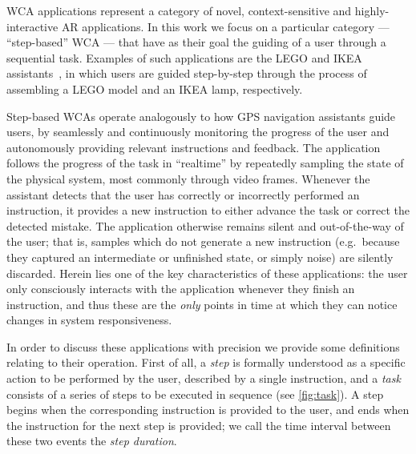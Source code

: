 \acf{WCA} applications represent a category of novel, context-sensitive and highly-interactive \ac{AR} applications.
In this work we focus on a particular category --- ``step-based'' \ac{WCA} --- that have as their goal the guiding of a user through a sequential task.
Examples of such applications are the LEGO and IKEA assistants~\cite{chen2015early,chen2018application}, in which users are guided step-by-step through the process of assembling a LEGO model and an IKEA lamp, respectively.

Step-based \acp{WCA} operate analogously to how \ac{GPS} navigation assistants guide users, by seamlessly and continuously monitoring the progress of the user and autonomously providing relevant instructions and feedback.
The application follows the progress of the task in ``realtime'' by repeatedly sampling the state of the physical system, most commonly through video frames.
Whenever the assistant detects that the user has correctly or incorrectly performed an instruction, it provides a new instruction to either advance the task or correct the detected mistake.
The application otherwise remains silent and out-of-the-way of the user; that is, samples which do not generate a new instruction (e.g.~because they captured an intermediate or unfinished state, or simply noise) are silently discarded.
Herein lies one of the key characteristics of these applications: the user only consciously interacts with the application whenever they finish an instruction, and thus these are the \emph{only} points in time at which they can notice changes in system responsiveness.

In order to discuss these applications with precision we provide some definitions relating to their operation.
First of all, a \emph{step} is formally understood as a specific action to be performed by the user, described by a single instruction, and a \emph{task} consists of a series of steps to be executed in sequence (see \cref{fig:task}).
A step begins when the corresponding instruction is provided to the user, and ends when the instruction for the next step is provided; we call the time interval between these two events the \emph{step duration}.

